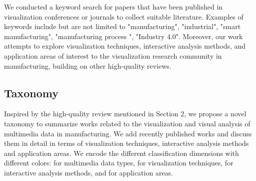 \documentclass[a4paper,fleqn]{cas-dc}
\begin{document}
We conducted a keyword search for papers that have been published in visualization conferences or journals to collect suitable literature.
Examples of keywords include but are not limited to "manufacturing", "industrial", "smart manufacturing", "manufacturing process ", "Industry 4.0".
Moreover, our work attempts to explore visualization techniques, interactive analysis methods, and application areas of interest to the visualization research community in manufacturing, building on other high-quality reviews.

\subsection{Taxonomy}
Inspired by the high-quality review mentioned in Section 2, we propose a novel taxonomy to summarize works related to the visualization and visual analysis of multimedia data in manufacturing.
We add recently published works and discuss them in detail in terms of visualization techniques, interactive analysis methods and application areas.
We encode the different classification dimensions with different colors:
 for multimedia data types, 
 for visualization techniques, 
 for interactive analysis methods, and 
 for application areas.
\end{document}
